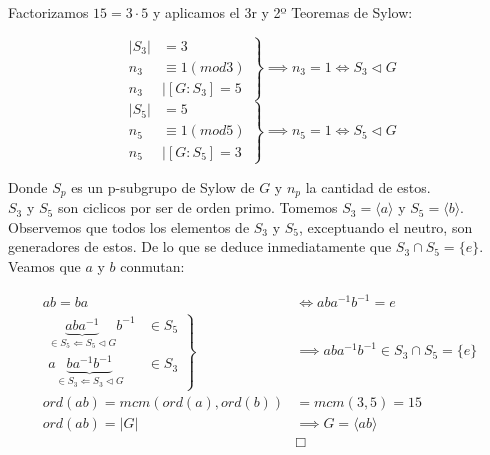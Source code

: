 \begin{solution} 
Factorizamos $15=3\cdot5$ y aplicamos el 3r y 2º Teoremas de Sylow:

\begin{equation}
 \left.\begin{aligned}
		|S_3| &= 3\\
		n_3 &\equiv 1 (mod 3)\\
		n_3 &\mid [G:S_3]=5
       \end{aligned}
 \right\}
 \implies n_3 = 1 \iff S_3 \triangleleft G
\end{equation}
\begin{equation} 
 \left.\begin{aligned}
		|S_5| &= 5\\
		n_5 &\equiv 1 (mod 5)\\
		n_5 &\mid [G:S_5]=3
       \end{aligned}
 \right\}
 \implies n_5 = 1 \iff S_5 \triangleleft G
\end{equation}

Donde $S_p$ es un p-subgrupo de Sylow de $G$ y $n_p$ la cantidad de estos.\\
$S_3$ y $S_5$ son ciclicos por ser de orden primo. Tomemos $S_3=\langle a \rangle$ y $S_5=\langle b \rangle$.\\
Observemos que todos los elementos de $S_3$ y $S_5$, exceptuando el neutro, son generadores de estos. De lo que se deduce inmediatamente que $S_3 \cap S_5 = \{e\}$.\\
Veamos que $a$ y $b$ conmutan:

\begin{align} 
ab=ba &\iff aba^{-1}b^{-1} = e \\
\left.\begin{aligned}
	\underbrace{a b a^{-1}}_{\in S_5 \Leftarrow S_5 \triangleleft G} b^{-1} &\in S_5 \\
	a\underbrace{b a^{-1} b^{-1}}_{\in S_3 \Leftarrow S_3 \triangleleft G} &\in S_3
   \end{aligned}
\right\}
&\implies aba^{-1}b^{-1} \in S_3 \cap S_5 = \{e\} \\
ord(ab) = mcm(ord(a), ord(b)) &= mcm(3, 5) = 15\\
ord(ab) = |G| &\implies G = \langle ab \rangle\\
&\Box
\end{align}


\end{solution}